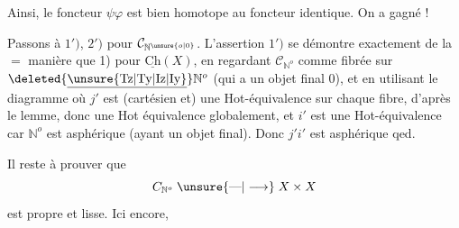 Ainsi, le foncteur $\psi\varphi$ est bien homotope au foncteur identique. On a gagné !

Passons à $1')$, $2')$ pour $\mathcal C_{\mathbb N^{\unsure{o|0}}}$. L'assertion $1')$ se démontre exactement de la $=$ manière que 1) pour $\underline{\mathrm{Ch}}(X)$, en regardant $\mathcal C_{\mathbb N^o}$ comme fibrée sur $\deleted{\underline{\unsure{\mathrm{Tz}|\mathrm{Ty}|\mathrm{Iz}|\mathrm{Iy}}}}\mathbb N^o$ (qui a un objet final $0$), et en utilisant le diagramme
 où $j'$ est (cartésien et) une Hot-équivalence sur chaque fibre, d'après le lemme, donc une Hot équivalence  globalement, et $i'$ est une Hot-équivalence car $\mathbb N^o$ est asphérique (ayant un objet final). Donc $j'i'$ est asphérique qed.

Il reste à prouver que
\[
C_{\mathbb N^o}\mathrel{\unsure{\text{---}|\longrightarrow}}X\times X
\]
est propre et lisse.  Ici encore,
